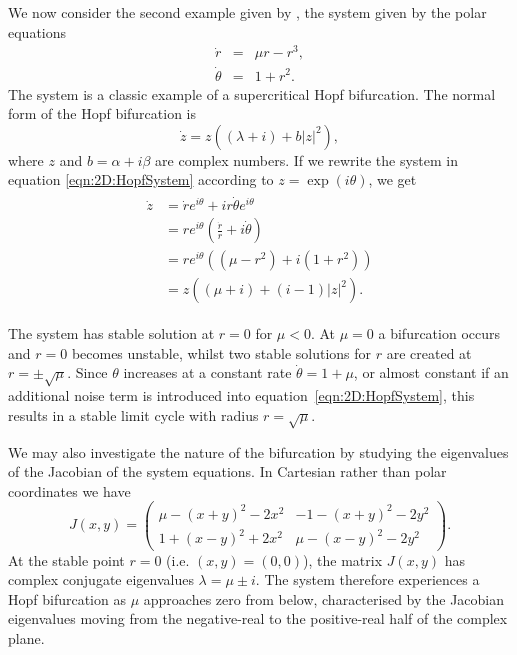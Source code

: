 We now consider the second example given by \citet{williamson2015}, the system given by the polar equations 
	\begin{equation}
		\begin{array}{rcl}
			\dot{r} &=& \mu r - r^3,\\
			\dot{\theta} &=& 1 + r^2.
		\end{array}
		\label{eqn:2D:HopfSystem}
	\end{equation}
The system is a classic example of a supercritical Hopf bifurcation. The normal form of the Hopf bifurcation is
\begin{equation}
	\dot{z} = z\left((\lambda+i)+b|z|^2\right),
\end{equation}
where $z$ and $b=\alpha+i\beta$ are complex numbers. 
If we rewrite the system in equation \ref{eqn:2D:HopfSystem} according to $z = \exp(i\theta)$, we get
	\begin{align}
		\begin{split}
			\dot{z} &= \dot{r}e^{i\theta}+ir\dot{\theta}e^{i\theta}\\
			&= re^{i\theta}\left(\frac{\dot{r}}{r}+i\dot{\theta}\right)\\
			&= re^{i\theta}\left((\mu-r^2)+i(1+r^2)\right)\\
			&= z\left((\mu+i)+(i-1)|z|^2\right).
		\end{split}
	\end{align}

The system has stable solution at $r=0$ for $\mu<0$. At $\mu=0$ a bifurcation occurs and $r=0$ becomes unstable, whilst two stable solutions for $r$ are created at $r = \pm\sqrt{\mu}$. Since $\theta$ increases at a constant rate $\dot{\theta}=1+\mu$, or almost constant if an additional noise term is introduced into equation~\ref{eqn:2D:HopfSystem}, this results in a stable limit cycle with radius $r=\sqrt{\mu}$. 

We may also investigate the nature of the bifurcation by studying the eigenvalues of the Jacobian of the system equations. In Cartesian rather than polar coordinates we have
	\begin{equation}
		J(x,y) =  
		\left(
		\begin{array}{cc}
		\mu - (x+y)^2-2x^2 & -1-(x+y)^2-2y^2\\
		1+(x-y)^2 + 2x^2 & \mu - (x-y)^2-2y^2
		\end{array} \right).
	\label{eqn:2D:HopfJacobian}
	\end{equation}
At the stable point $r=0$ (i.e. $(x,y)=(0,0)$), the matrix $J(x,y)$ has complex conjugate eigenvalues $\lambda=\mu\pm i$. The system therefore experiences a Hopf bifurcation as $\mu$ approaches zero from below, characterised by the Jacobian eigenvalues moving from the negative-real to the positive-real half of the complex plane.

